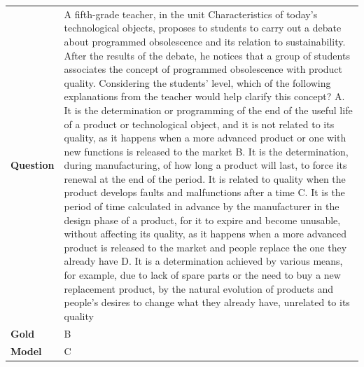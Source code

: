 \begin{longtable}{@{}l p{13cm}@{}}
  \textbf{Question}  & A fifth-grade teacher, in the unit Characteristics of today's technological objects, proposes to students to carry out a debate about programmed obsolescence and its relation to sustainability. After the results of the debate, he notices that a group of students associates the concept of programmed obsolescence with product quality. Considering the students' level, which of the following explanations from the teacher would help clarify this concept? \newline A. It is the determination or programming of the end of the useful life of a product or technological object, and it is not related to its quality, as it happens when a more advanced product or one with new functions is released to the market \newline B. It is the determination, during manufacturing, of how long a product will last, to force its renewal at the end of the period. It is related to quality when the product develops faults and malfunctions after a time \newline C. It is the period of time calculated in advance by the manufacturer in the design phase of a product, for it to expire and become unusable, without affecting its quality, as it happens when a more advanced product is released to the market and people replace the one they already have \newline D. It is a determination achieved by various means, for example, due to lack of spare parts or the need to buy a new replacement product, by the natural evolution of products and people's desires to change what they already have, unrelated to its quality   \\
  \textbf{Gold}      & B       \\
  \textbf{Model}     & C  \\

\end{longtable}
